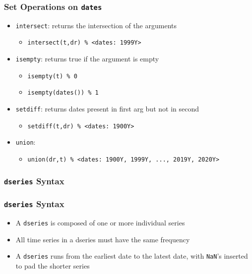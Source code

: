 \documentclass[10pt]{beamer}
\begin{document}
\begin{frame}[fragile,t]
  \frametitle{Set Operations on \texttt{dates}}
  \begin{itemize}
  \item \texttt{intersect}: returns the intersection of the arguments
    \begin{itemize}
    \item \texttt{intersect(t,dr) \% <dates: 1999Y>}
    \end{itemize}
  \item \texttt{isempty}: returns true if the argument is empty
    \begin{itemize}
    \item \texttt{isempty(t) \% 0}
    \item \texttt{isempty(dates()) \% 1}
    \end{itemize}
  \item \texttt{setdiff}: returns dates present in first arg but not in second
    \begin{itemize}
    \item \texttt{setdiff(t,dr) \% <dates: 1900Y>}
    \end{itemize}
  \item \texttt{union}:
    \begin{itemize}
    \item \texttt{union(dr,t) \% <dates: 1900Y, 1999Y,  ..., 2019Y, 2020Y>}
    \end{itemize}
  \end{itemize}
\end{frame}


%
%
\subsubsection{\texttt{dseries} Syntax}
\begin{frame}[fragile,t]
  \frametitle{\texttt{dseries} Syntax}
  \begin{itemize}
  \item A \texttt{dseries} is composed of one or more individual series
  \item All time series in a dseries must have the same frequency
  \item A \texttt{dseries} runs from the earliest date to the latest date, with \texttt{NaN}'s inserted to pad the shorter series
  \end{itemize}
\end{frame}
\end{document}
